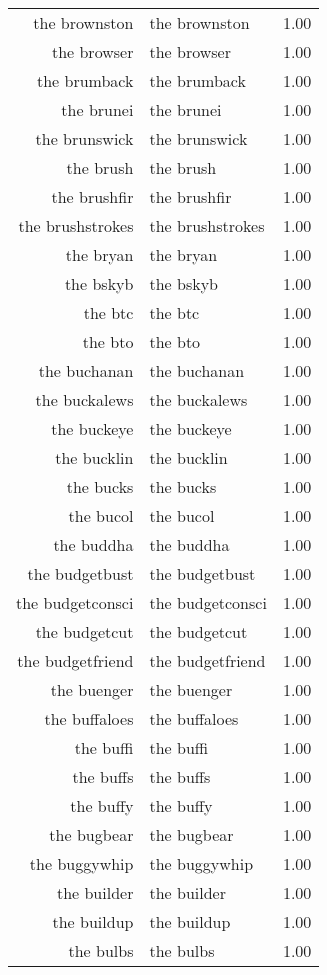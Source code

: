 \begin{table}[ht]
\begin{tabular}{rlr}
  the brownston & the brownston & 1.00 \\ 
  the browser & the browser & 1.00 \\ 
  the brumback & the brumback & 1.00 \\ 
  the brunei & the brunei & 1.00 \\ 
  the brunswick & the brunswick & 1.00 \\ 
  the brush & the brush & 1.00 \\ 
  the brushfir & the brushfir & 1.00 \\ 
  the brushstrokes & the brushstrokes & 1.00 \\ 
  the bryan & the bryan & 1.00 \\ 
  the bskyb & the bskyb & 1.00 \\ 
  the btc & the btc & 1.00 \\ 
  the bto & the bto & 1.00 \\ 
  the buchanan & the buchanan & 1.00 \\ 
  the buckalews & the buckalews & 1.00 \\ 
  the buckeye & the buckeye & 1.00 \\ 
  the bucklin & the bucklin & 1.00 \\ 
  the bucks & the bucks & 1.00 \\ 
  the bucol & the bucol & 1.00 \\ 
  the buddha & the buddha & 1.00 \\ 
  the budgetbust & the budgetbust & 1.00 \\ 
  the budgetconsci & the budgetconsci & 1.00 \\ 
  the budgetcut & the budgetcut & 1.00 \\ 
  the budgetfriend & the budgetfriend & 1.00 \\ 
  the buenger & the buenger & 1.00 \\ 
  the buffaloes & the buffaloes & 1.00 \\ 
  the buffi & the buffi & 1.00 \\ 
  the buffs & the buffs & 1.00 \\ 
  the buffy & the buffy & 1.00 \\ 
  the bugbear & the bugbear & 1.00 \\ 
  the buggywhip & the buggywhip & 1.00 \\ 
  the builder & the builder & 1.00 \\ 
  the buildup & the buildup & 1.00 \\ 
  the bulbs & the bulbs & 1.00 \\ 

\end{tabular}
\end{table}
